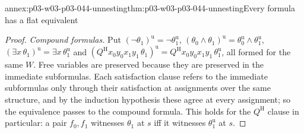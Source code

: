 \begin{annexitem}{annex:p03-w03-p03-044-unnesting}{thm:p03-w03-p03-044-unnesting}{Every formula has a flat equivalent}
\begin{proof}
\emph{Compound formulas.}  Put \((\neg\theta_1)^{\mathrm u}=\neg
\theta_1^{\mathrm u}\), \((\theta_0\land\theta_1)^{\mathrm u}=
\theta_0^{\mathrm u}\land\theta_1^{\mathrm u}\), \((\exists x\,
\theta_1)^{\mathrm u}=\exists x\,\theta_1^{\mathrm u}\) and
\((Q^{\mathrm H}x_0y_0x_1y_1\,\theta_1)^{\mathrm u}=Q^{\mathrm
H}x_0y_0x_1y_1\,\theta_1^{\mathrm u}\), all formed for the same \(W\).
Free variables are preserved because they are preserved in the immediate
subformulas.  Each satisfaction clause refers to the immediate subformulas
only through their satisfaction at assignments over the same structure, and
by the induction hypothesis these agree at every assignment; so the
equivalence passes to the compound formula.  This holds for the
\(Q^{\mathrm H}\) clause in particular: a pair \(f_0,f_1\) witnesses
\(\theta_1\) at \(s\) iff it witnesses \(\theta_1^{\mathrm u}\) at \(s\).
\end{proof}
\end{annexitem}

